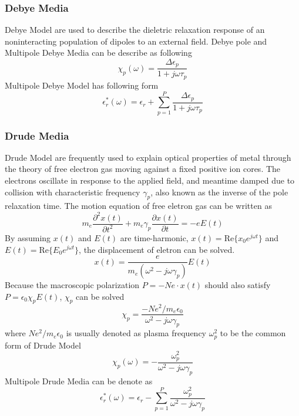 \subsubsection{Debye Media}
Debye Model are used to describe the dieletric relaxation response of an noninteracting population of dipoles to an
external field. Debye pole and Multipole Debye Media can be describe as following
\begin{equation}
  \label{eq:debye_chi}
  \chi_p(\omega) = \frac{\Delta\epsilon_p}{1+j\omega\tau_p}  
\end{equation}
Multipole Debye Model has following form
\begin{equation}
  \epsilon_r^*(\omega) = \epsilon_r + \sum_{p=1}^P \frac{\Delta\epsilon_p}{1+j\omega\tau_p}  
\end{equation}


\subsubsection{Drude Media}
Drude Model are frequently used to explain optical properties of metal through the theory of free electron gas moving
against a fixed positive ion cores. The electrons oscillate in response to the applied field, and meantime damped due to
collision with characteristic frequency $\gamma_p$, also known as the inverse of the pole relaxation time. The motion
equation of free eletron gas can be written as
\begin{equation}
  m_e\frac{\partial^2 x(t)}{\partial t^2} + m_e\gamma_p\frac{\partial x(t)}{\partial t} = -eE(t)
\end{equation}
By assuming $x(t)$ and $E(t)$ are time-harmonic, $x(t) = \mathrm{Re}\{x_0e^{j\omega t}\}$ and $E(t) =
\mathrm{Re}\{E_0e^{j\omega t}\}$, the displacement of eletron can be solved.
\begin{equation}
  x(t) = \frac{e}{m_e(\omega^2 - j\omega\gamma_p)}E(t)
\end{equation}
Because the macroscopic polarization $P = -Ne\cdot x(t)$ should also satisfy $P = \epsilon_0\chi_pE(t)$, $\chi_p$ can be
solved
\begin{equation}
  \chi_p = \frac{-Ne^2/m_e\epsilon_0}{\omega^2 - j\omega\gamma_p}
\end{equation}
where $Ne^2/m_e\epsilon_0$ is usually denoted as plasma frequency $\omega_p^2$ to be the common form of Drude Model
\begin{equation}
  \label{eq:drude_chi}
  \chi_p(\omega) = -\frac{\omega_p^2}{\omega^2 - j\omega\gamma_p}  
\end{equation}
Multipole Drude Media can be denote as 
\begin{equation}
  \epsilon_r^*(\omega) = \epsilon_r - \sum_{p=1}^P \frac{\omega_p^2}{\omega^2-j\omega\gamma_p}
\end{equation}



